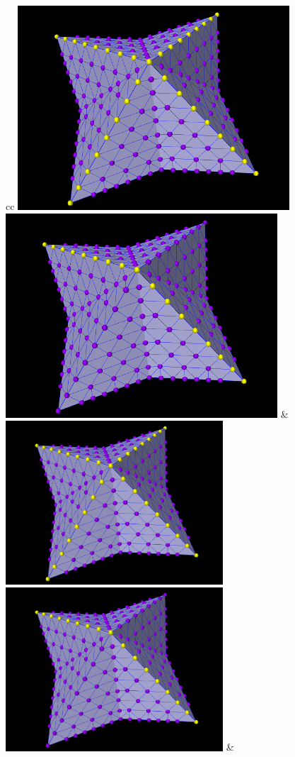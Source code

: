 \documentclass{article}
\begin{document}
\begin{center}
\begin{tabular}{cc}
\iflatexml
\includegraphics[]{../uiguide/images/nodeEdgeSelectBranching}
\includegraphics[]{../uiguide/images/nodeEdgeSelect} &
\else
\includegraphics[width=3.2in]{../uiguide/images/nodeEdgeSelectBranching}
\includegraphics[width=3.2in]{../uiguide/images/nodeEdgeSelect} &
\fi
\end{tabular}
\end{center}
\end{document}
